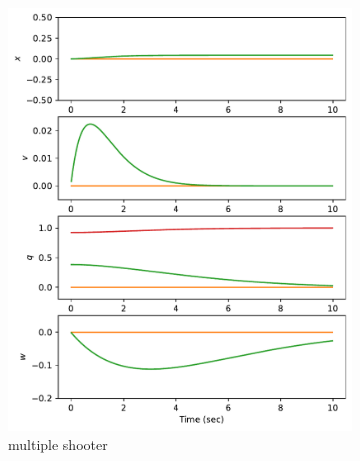 \documentclass[]{article}
\begin{document}
\begin{figure}[H]
	\centering
	\begin{subfigure}[b]{0.3\textwidth}
		\centering
		\includegraphics[width=\textwidth]{figures/state45dz3.pdf}
		\caption{multiple shooter}
	\end{subfigure}
	\begin{subfigure}[b]{0.3\textwidth}
		\centering

\end{subfigure}
\end{figure}
\end{document}
